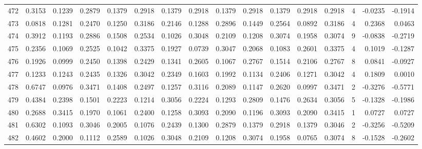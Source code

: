 \begin{tabular}{lrrrrrrrrrrrrrrr}
472 &      0.3153 &  0.1239 &  0.2879 &  0.1379 &  0.2918 &  0.1379 &  0.2918 &  0.1379 &  0.2918 &  0.1379 &   0.2918 &     0.2918 &      4 &                   -0.0235 &                    -0.1914 \\
473 &      0.0818 &  0.1281 &  0.2470 &  0.1250 &  0.3186 &  0.2146 &  0.1288 &  0.2896 &  0.1449 &  0.2564 &   0.0892 &     0.3186 &      4 &                    0.2368 &                     0.0463 \\
474 &      0.3912 &  0.1193 &  0.2886 &  0.1508 &  0.2534 &  0.1026 &  0.3048 &  0.2109 &  0.1208 &  0.3074 &   0.1958 &     0.3074 &      9 &                   -0.0838 &                    -0.2719 \\
475 &      0.2356 &  0.1069 &  0.2525 &  0.1042 &  0.3375 &  0.1927 &  0.0739 &  0.3047 &  0.2068 &  0.1083 &   0.2601 &     0.3375 &      4 &                    0.1019 &                    -0.1287 \\
476 &      0.1926 &  0.0999 &  0.2450 &  0.1398 &  0.2429 &  0.1341 &  0.2605 &  0.1067 &  0.2767 &  0.1514 &   0.2106 &     0.2767 &      8 &                    0.0841 &                    -0.0927 \\
477 &      0.1233 &  0.1243 &  0.2435 &  0.1326 &  0.3042 &  0.2349 &  0.1603 &  0.1992 &  0.1134 &  0.2406 &   0.1271 &     0.3042 &      4 &                    0.1809 &                     0.0010 \\
478 &      0.6747 &  0.0976 &  0.3471 &  0.1408 &  0.2497 &  0.1257 &  0.3116 &  0.2089 &  0.1147 &  0.2620 &   0.0997 &     0.3471 &      2 &                   -0.3276 &                    -0.5771 \\
479 &      0.4384 &  0.2398 &  0.1501 &  0.2223 &  0.1214 &  0.3056 &  0.2224 &  0.1293 &  0.2809 &  0.1476 &   0.2634 &     0.3056 &      5 &                   -0.1328 &                    -0.1986 \\
480 &      0.2688 &  0.3415 &  0.1970 &  0.1061 &  0.2400 &  0.1258 &  0.3093 &  0.2090 &  0.1196 &  0.3093 &   0.2090 &     0.3415 &      1 &                    0.0727 &                     0.0727 \\
481 &      0.6302 &  0.1093 &  0.3046 &  0.2005 &  0.1076 &  0.2439 &  0.1300 &  0.2879 &  0.1379 &  0.2918 &   0.1379 &     0.3046 &      2 &                   -0.3256 &                    -0.5209 \\
482 &      0.4602 &  0.2000 &  0.1112 &  0.2589 &  0.1026 &  0.3048 &  0.2109 &  0.1208 &  0.3074 &  0.1958 &   0.0765 &     0.3074 &      8 &                   -0.1528 &                    -0.2602 \\

\end{tabular}
